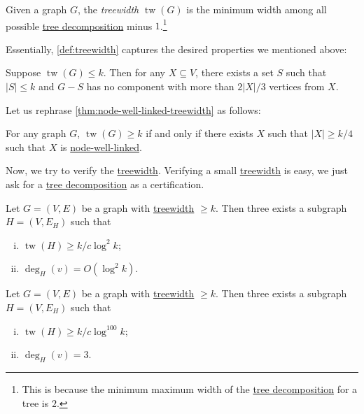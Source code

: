 \begin{definition}[Treewidth]\label{def:treewidth}
	Given a graph \(G\), the \emph{treewidth} \(\operatorname{tw}(G) \) is the minimum width among all possible \hyperref[def:tree-decomposition]{tree decomposition} minus \(1\).\footnote{This is because the minimum maximum width of the \hyperref[def:tree-decomposition]{tree decomposition} for a tree is \(2\).}
\end{definition}

Essentially, \autoref{def:treewidth} captures the desired properties we mentioned above:

\begin{claim}
	Suppose \(\operatorname{tw}(G) \leq k\). Then for any \(X \subseteq V\), there exists a set \(S\) such that \(\lvert S \rvert \leq k\) and \(G-S\) has no component with more than \(2 \lvert X \rvert / 3\) vertices from \(X\).
\end{claim}

Let us rephrase \autoref{thm:node-well-linked-treewidth} as follows:

\begin{lemma}\label{lma:node-well-linked-treewidth}
	For any graph \(G\), \(\operatorname{tw}(G) \geq k\) if and only if there exists \(X\) such that \(\lvert X \rvert \geq k / 4\) such that \(X\) is \hyperref[def:node-well-linked]{node-well-linked}.
\end{lemma}

Now, we try to verify the \hyperref[def:treewidth]{treewidth}. Verifying a small \hyperref[def:treewidth]{treewidth} is easy, we just ask for a \hyperref[def:tree-decomposition]{tree decomposition} as a certification.

\begin{theorem}
	Let \(G = (V, E)\) be a graph with \hyperref[def:treewidth]{treewidth} \(\geq k\). Then three exists a subgraph \(H = (V, E_H)\) such that
	\begin{enumerate}[(i)]
		\item \(\operatorname{tw}(H) \geq k / c \log ^2 k\);
		\item \(\deg_H(v) = O(\log ^2 k)\).
	\end{enumerate}
\end{theorem}

\begin{theorem}
	Let \(G = (V, E)\) be a graph with \hyperref[def:treewidth]{treewidth} \(\geq k\). Then three exists a subgraph \(H = (V, E_H)\) such that
	\begin{enumerate}[(i)]
		\item \(\operatorname{tw}(H) \geq k / c \log ^{100} k\);
		\item \(\deg_H(v) = 3\).
	\end{enumerate}
\end{theorem}

